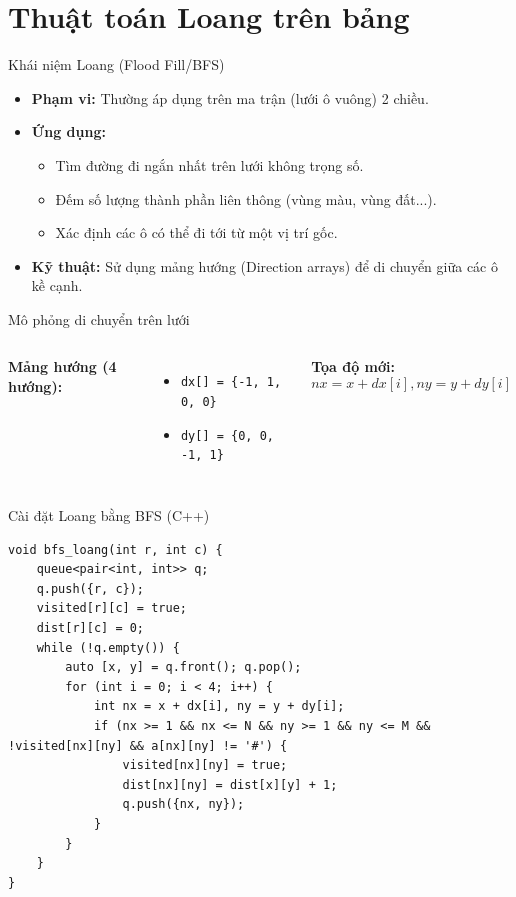 \documentclass[aspectratio=169]{beamer}
\begin{document}
\section{Thuật toán Loang trên bảng}

\begin{frame}{Khái niệm Loang (Flood Fill/BFS)}
\begin{itemize}
    \item \textbf{Phạm vi:} Thường áp dụng trên ma trận (lưới ô vuông) 2 chiều.
    \item \textbf{Ứng dụng:} 
    \begin{itemize}
        \item Tìm đường đi ngắn nhất trên lưới không trọng số.
        \item Đếm số lượng thành phần liên thông (vùng màu, vùng đất...).
        \item Xác định các ô có thể đi tới từ một vị trí gốc.
    \end{itemize}
    \item \textbf{Kỹ thuật:} Sử dụng mảng hướng (Direction arrays) để di chuyển giữa các ô kề cạnh.
\end{itemize}
\end{frame}

\begin{frame}{Mô phỏng di chuyển trên lưới}
\begin{columns}
\centering
{}
\textbf{Mảng hướng (4 hướng):}
\begin{itemize}
    \item \texttt{dx[] = \{-1, 1, 0, 0\}}
    \item \texttt{dy[] = \{0, 0, -1, 1\}}
\end{itemize}
\textbf{Tọa độ mới:}
\[ nx = x + dx[i], ny = y + dy[i] \]
\end{columns}
\end{frame}

\begin{frame}[fragile]{Cài đặt Loang bằng BFS (C++)}
\begin{lstlisting}
void bfs_loang(int r, int c) {
    queue<pair<int, int>> q;
    q.push({r, c});
    visited[r][c] = true;
    dist[r][c] = 0;
    while (!q.empty()) {
        auto [x, y] = q.front(); q.pop();
        for (int i = 0; i < 4; i++) {
            int nx = x + dx[i], ny = y + dy[i];
            if (nx >= 1 && nx <= N && ny >= 1 && ny <= M && !visited[nx][ny] && a[nx][ny] != '#') {
                visited[nx][ny] = true;
                dist[nx][ny] = dist[x][y] + 1;
                q.push({nx, ny});
            }
        }
    }
}
\end{lstlisting}
\end{frame}
\end{document}
